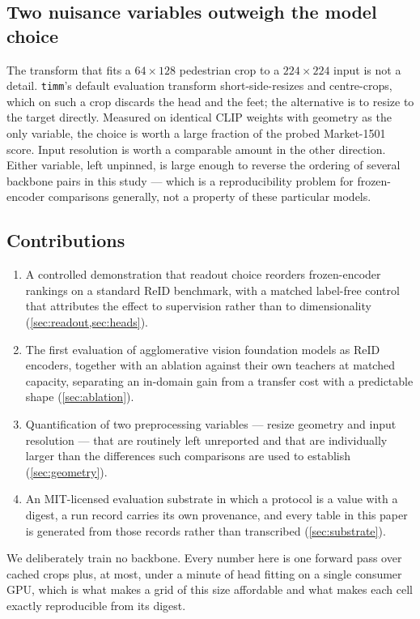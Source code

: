 \subsection*{Two nuisance variables outweigh the model choice}
The transform that fits a $64\times128$ pedestrian crop to a $224\times224$ input is not a
detail. \texttt{timm}'s default evaluation transform short-side-resizes and centre-crops,
which on such a crop discards the head and the feet; the alternative is to resize to the target
directly. Measured on identical CLIP weights with geometry as the only variable, the choice is
worth a large fraction of the probed Market-1501 score. Input resolution is worth a comparable
amount in the other direction. Either variable, left unpinned, is large enough to reverse the
ordering of several backbone pairs in this study --- which is a reproducibility problem for
frozen-encoder comparisons generally, not a property of these particular models.

\subsection*{Contributions}
\begin{enumerate}
  \item A controlled demonstration that readout choice reorders frozen-encoder rankings on a
        standard ReID benchmark, with a matched label-free control that attributes the effect
        to supervision rather than to dimensionality (\cref{sec:readout,sec:heads}).
  \item The first evaluation of agglomerative vision foundation models as ReID encoders,
        together with an ablation against their own teachers at matched capacity, separating
        an in-domain gain from a transfer cost with a predictable shape
        (\cref{sec:ablation}).
  \item Quantification of two preprocessing variables --- resize geometry and input resolution
        --- that are routinely left unreported and that are individually larger than the
        differences such comparisons are used to establish (\cref{sec:geometry}).
  \item An MIT-licensed evaluation substrate in which a protocol is a value with a digest, a
        run record carries its own provenance, and every table in this paper is generated from
        those records rather than transcribed (\cref{sec:substrate}).
\end{enumerate}

We deliberately train no backbone. Every number here is one forward pass over cached crops
plus, at most, under a minute of head fitting on a single consumer GPU, which is what makes a
grid of this size affordable and what makes each cell exactly reproducible from its digest.
